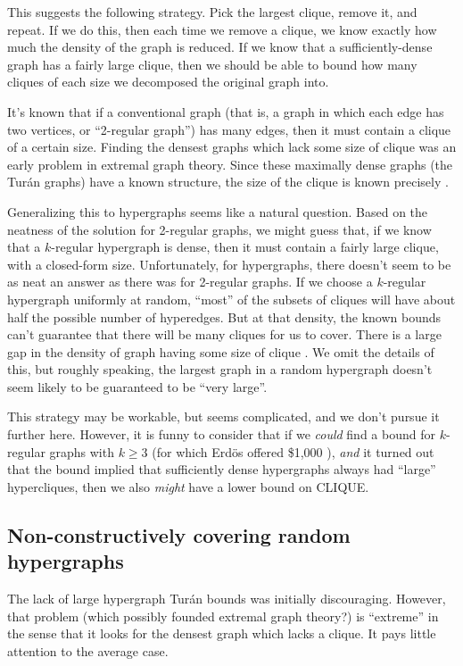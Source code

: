 \documentclass[12pt]{article}
\theoremstyle{definition}
\begin{document}
This suggests the following strategy. Pick the largest clique, remove it, and
repeat. If we do this, then each time we remove a clique, we know exactly
how much the density of the graph is reduced. If we know that a
sufficiently-dense graph has a fairly large clique, then we should be able
to bound how many cliques of each size we decomposed the original graph into.

It's known that if a conventional graph (that is, a graph
in which each edge has two vertices, or ``2-regular graph'')
has many edges, then it must contain a clique of a certain size.
Finding the densest graphs which lack some size of clique was an
early problem in extremal graph theory. Since these maximally dense graphs
(the Tur\'an graphs) have a known structure, the size of the clique is
known precisely \cite{turan1941external}.

Generalizing this to hypergraphs seems like a natural question.
Based on the neatness of the solution for 2-regular graphs,
we might guess that, if we know that a $k$-regular hypergraph is dense,
then it must contain a fairly large clique, with a closed-form size.
Unfortunately, for hypergraphs, there doesn't seem to be as neat
an answer as there was for 2-regular graphs. 
If we choose a $k$-regular hypergraph uniformly at random,
``most'' of the subsets of cliques will have about half the
possible number of hyperedges. But at that density,
the known
bounds can't guarantee that there will be many cliques for us to cover.
There is a large gap in the density of graph having some size
of clique
\cite{keevash2011hypergraph}. We omit the details of this, but
roughly speaking,
the largest graph in a random hypergraph doesn't seem likely to be
guaranteed to be ``very large''.

This strategy may be workable, but seems complicated, and we don't pursue
it further here.
However, it is funny to consider that if we {\em could} find a
bound for $k$-regular graphs with $k \ge 3$
(for which Erd\"os offered \$1,000 \cite{keevash2011hypergraph}),
{\em and} it turned
out that the bound implied that sufficiently dense hypergraphs always had
``large'' hypercliques, then we also {\em might} have a
lower bound on CLIQUE.

\subsection{Non-constructively covering random hypergraphs}

The lack of large hypergraph Tur\'an bounds was initially discouraging.
However, that problem (which possibly founded extremal graph theory?) is
``extreme'' in the sense that it looks for the densest graph which lacks
a clique. It pays little attention to the average case.
\end{document}
